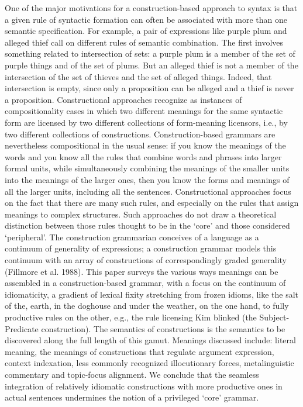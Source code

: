 One of the major motivations for a construction-based approach to syntax is that a given rule of syntactic formation can often be associated with more than one semantic specification. For example, a pair of expressions like purple plum and alleged thief call on different rules of semantic combination. The first involves something related to intersection of sets: a purple plum is a member of the set of purple things and of the set of plums. But an alleged thief is not a member of the intersection of the set of thieves and the set of alleged things. Indeed, that intersection is empty, since only a proposition can be alleged and a thief is never a proposition. Constructional approaches recognize as instances of compositionality cases in which two different meanings for the same syntactic form are licensed by two different collections of form-meaning licensors, i.e., by two different collections of constructions. Construction-based grammars are nevertheless compositional in the usual sense: if you know the meanings of the words and you know all the rules that combine words and phrases into larger formal units, while simultaneously combining the meanings of the smaller units into the meanings of the larger ones, then you know the forms and meanings of all the larger units, including all the sentences. Constructional approaches focus on the fact that there are many such rules, and especially on the rules that assign meanings to complex structures. Such approaches do not draw a theoretical distinction between those rules thought to be in the ‘core' and those considered ‘peripheral'. The construction grammarian conceives of a language as a continuum of generality of expressions; a construction grammar models this continuum with an array of constructions of correspondingly graded generality (Fillmore et al. 1988). This paper surveys the various ways meanings can be assembled in a construction-based grammar, with a focus on the continuum of idiomaticity, a gradient of lexical fixity stretching from frozen idioms, like the salt of the, earth, in the doghouse and under the weather, on the one hand, to fully productive rules on the other, e.g., the rule licensing Kim blinked (the Subject-Predicate construction). The semantics of constructions is the semantics to be discovered along the full length of this gamut. Meanings discussed include: literal meaning, the meanings of constructions that regulate argument expression, context indexation, less commonly recognized illocutionary forces, metalinguistic commentary and topic-focus alignment. We conclude that the seamless integration of relatively idiomatic constructions with more productive ones in actual sentences undermines the notion of a privileged ‘core' grammar.
